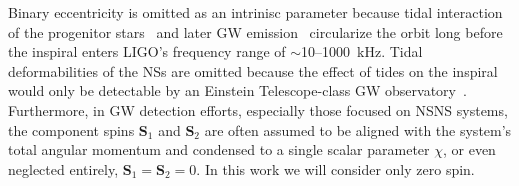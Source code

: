 \documentclass{iopart}
\begin{document}
%
Binary eccentricity is omitted as an intrinisc parameter because tidal interaction of the progenitor stars~\cite{0004-637X-572-1-407} and later \ac{GW} emission~\cite{PhysRev.136.B1224} circularize the orbit long before the inspiral enters \ac{LIGO}'s frequency range of $\sim$10\nobreakdashes--1000~kHz. Tidal deformabilities of the \acp{NS} are omitted because the effect of tides on the inspiral would only be detectable by an Einstein Telescope-class \ac{GW} observatory~\cite{PhysRevD.81.123016}. Furthermore, in \ac{GW} detection efforts, especially those focused on \ac{NSNS} systems, the component spins $\mathbf{S}_1$ and $\mathbf{S}_2$ are often assumed to be aligned with the system's total angular momentum and condensed to a single scalar parameter $\chi$, or even neglected entirely, $\mathbf{S}_1 = \mathbf{S}_2 = 0$. In this work we will consider only zero spin.
\end{document}
